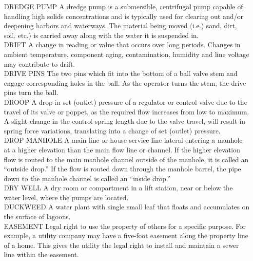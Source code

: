 DREDGE PUMP
A dredge pump is a submersible, centrifugal pump capable of handling high solids concentrations and is typically used for clearing out and/or deepening harbors and waterways. The material being moved (i.e.) sand, dirt, soil, etc.) is carried away along with the water it is suspended in.
\vspace{0.3cm}\\
DRIFT
A change in reading or value that occurs over long periods. Changes in ambient temperature, component aging, contamination, humidity and line voltage may contribute to drift.
\vspace{0.3cm}\\
DRIVE PINS
The two pins which fit into the bottom of a ball valve stem and engage corresponding holes in the ball. As the operator turns the stem, the drive pins turn the ball.
\vspace{0.3cm}\\
DROOP
A drop in set (outlet) pressure of a regulator or control valve due to the travel of its valve or poppet, as the required flow increases from low to maximum. A slight change in the control spring length due to the valve travel, will result in spring force variations, translating into a change of set (outlet) pressure.
\vspace{0.3cm}\\
DROP MANHOLE
A main line or house service line lateral entering a manhole at a higher elevation than the main flow line or channel. If the higher elevation flow is routed to the main manhole channel outside of the manhole, it is called an “outside drop.” If the flow is routed down through the manhole barrel, the pipe down to the manhole channel is called an “inside drop.” 
\vspace{0.3cm}\\
DRY WELL
A dry room or compartment in a lift station, near or below the water level, where the pumps are located. 
\vspace{0.3cm}\\
DUCKWEED
A water plant with single small leaf that floats and accumulates on the surface of lagoons.
\vspace{0.3cm}\\
EASEMENT
Legal right to use the property of others for a specific purpose. For example, a utility company may have a five-foot easement along the property line of a home. This gives the utility the legal right to install and maintain a sewer line within the easement. 
\vspace{0.3cm}\\
